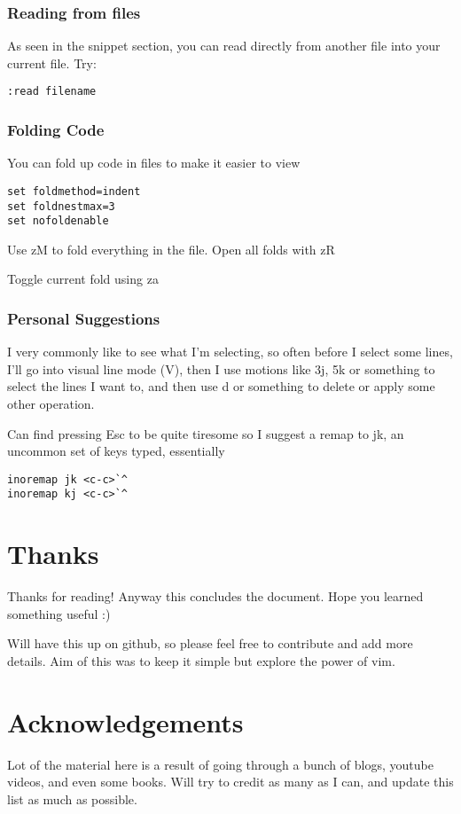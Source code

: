 \documentclass[12pt, letterpaper]{article}
\begin{document}
\subsubsection{Reading from files}
As seen in the snippet section, you can read directly from another file into
your current file. Try:

\begin{verbatim}
:read filename
\end{verbatim}

\subsubsection{Folding Code}
You can fold up code in files to make it easier to view
\begin{verbatim}
set foldmethod=indent
set foldnestmax=3
set nofoldenable
\end{verbatim}
Use zM to fold everything in the file. Open all folds with zR

Toggle current fold using za

\subsubsection{Personal Suggestions}
I very commonly like to see what I'm selecting, so often before I select some
lines, I'll go into visual line mode (V), then I use motions like 3j, 5k or
something to select the lines I want to, and then use d or something to delete
or apply some other operation.


Can find pressing Esc to be quite tiresome so I suggest a remap to jk, an
uncommon set of keys typed, essentially 

\begin{verbatim}
inoremap jk <c-c>`^
inoremap kj <c-c>`^
\end{verbatim}

\section{Thanks}
Thanks for reading! Anyway this concludes the document. Hope you learned
something useful :)

Will have this up on github, so please feel free to contribute and add more
details. Aim of this was to keep it simple but explore the power of vim.

\section{Acknowledgements}
Lot of the material here is a result of going through a bunch of blogs, youtube
videos, and even some books. Will try to credit as many as I can, and update
this list as much as possible.
\end{document}
